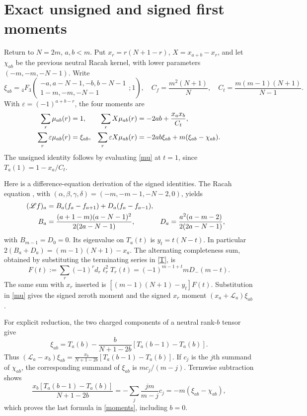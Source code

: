\documentclass[11pt,a4paper]{article}
\begin{document}
\newpage
\section{Exact unsigned and signed first moments}
Return to $N=2m$, $a,b<m$. Put $x_r=r(N+1-r)$,
$X=x_{a+b}-x_r$, and let $\chi_{ab}$ be the previous neutral
Racah kernel, with lower parameters $(-m,-m,-N-1)$.
Write
\begin{equation}
 \xi_{ab}={}_4F_3\!\left(\begin{matrix}-a,a-N-1,-b,b-N-1\\
 1-m,-m,-N-1\end{matrix};1\right),\quad
 C_f=\frac{m^2(N+1)}N,\quad
 C_t=\frac{m(m-1)(N+1)}{N-1}.
\end{equation}
With $\varepsilon=(-1)^{a+b-r}$, the four moments are
\begin{align}
 \sum_r\mu_{ab}(r)&=1,&
 \sum_rX\mu_{ab}(r)&=-2ab+\frac{x_ax_b}{C_t},\notag\\
 \sum_r\varepsilon\mu_{ab}(r)&=\xi_{ab},&
 \sum_r\varepsilon X\mu_{ab}(r)
 &=-2ab\xi_{ab}+m(\xi_{ab}-\chi_{ab}).\label{moments}
\end{align}
The unsigned identity follows by evaluating \eqref{mu} at $t=1$,
since $T_a(1)=1-x_a/C_t$.

Here is a difference-equation derivation of the signed identities.
The Racah equation \cite{ks}, with
$(\alpha,\beta,\gamma,\delta)=(-m,-m-1,-N-2,0)$, yields
\begin{align}
 (\mathscr Lf)_a&=B_a(f_a-f_{a+1})+D_a(f_a-f_{a-1}),\notag\\
 B_a&=\frac{(a+1-m)(a-N-1)^2}{2(2a-N-1)},&
 D_a&=\frac{a^2(a-m-2)}{2(2a-N-1)},\label{rates}
\end{align}
with $B_{m-1}=D_0=0$. Its eigenvalue on $T_a(t)$ is $y_t=t(N-t)$.
In particular $2(B_a+D_a)=(m-1)(N+1)-x_a$.
The alternating completeness sum, obtained by substituting the
terminating series in \eqref{T}, is
\begin{equation}
 F(t):=\sum_r(-1)^rd_r\ell_r^2T_r(t)
   =(-1)^{m-1+t}mD_-(m-t).
\end{equation}
The same sum with $x_r$ inserted is
$[(m-1)(N+1)-y_t]F(t)$. Substitution in \eqref{mu} gives the
signed zeroth moment and the signed $x_r$ moment
$(x_a+\mathscr L_a)\xi_{ab}$.

For explicit reduction, the two charged components of a neutral
rank-$b$ tensor give
\begin{equation}
 \xi_{ab}=T_a(b)-\frac b{N+1-2b}[T_a(b-1)-T_a(b)].
\end{equation}
Thus $(\mathscr L_a-x_b)\xi_{ab}=
\frac{x_b}{N+1-2b}[T_a(b-1)-T_a(b)]$.
If $c_j$ is the $j$th summand of $\chi_{ab}$, the corresponding
summand of $\xi_{ab}$ is $mc_j/(m-j)$. Termwise subtraction shows
\begin{equation}
 \frac{x_b[T_a(b-1)-T_a(b)]}{N+1-2b}
 =-\sum_j\frac{jm}{m-j}c_j=-m(\xi_{ab}-\chi_{ab}),
\end{equation}
which proves the last formula in \eqref{moments}, including $b=0$.
\end{document}
